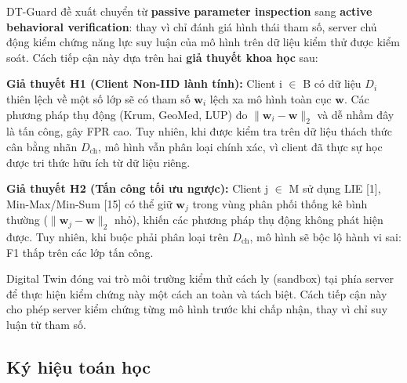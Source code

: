 DT-Guard đề xuất chuyển từ \textbf{passive parameter inspection} sang \textbf{active behavioral verification}: thay vì chỉ đánh giá hình thái tham số, server chủ động kiểm chứng năng lực suy luận của mô hình trên dữ liệu kiểm thử được kiểm soát. Cách tiếp cận này dựa trên hai \textbf{giả thuyết khoa học} sau:

\textbf{Giả thuyết H1 (Client Non-IID lành tính):} Client i $\in$ B có dữ liệu $D_{i}$ thiên lệch về một số lớp sẽ có tham số $\mathbf{w}_{i}$ lệch xa mô hình toàn cục $\mathbf{w}$. Các phương pháp thụ động (Krum, GeoMed, LUP) đo $\|\mathbf{w}_{i} - \mathbf{w}\|_{2}$ và dễ nhầm đây là tấn công, gây FPR cao. Tuy nhiên, khi được kiểm tra trên dữ liệu thách thức cân bằng nhãn $D_{\text{ch}}$, mô hình vẫn phân loại chính xác, vì client đã thực sự học được tri thức hữu ích từ dữ liệu riêng.

\textbf{Giả thuyết H2 (Tấn công tối ưu ngược):} Client j $\in$ M sử dụng LIE {[}1{]}, Min-Max/Min-Sum {[}15{]} có thể giữ $\mathbf{w}_{j}$ trong vùng phân phối thống kê bình thường ($\|\mathbf{w}_{j} - \mathbf{w}\|_{2}$ nhỏ), khiến các phương pháp thụ động không phát hiện được. Tuy nhiên, khi buộc phải phân loại trên $D_{\text{ch}}$, mô hình sẽ bộc lộ hành vi sai: F1 thấp trên các lớp tấn công.

Digital Twin đóng vai trò môi trường kiểm thử cách ly (sandbox) tại phía server để thực hiện kiểm chứng này một cách an toàn và tách biệt. Cách tiếp cận này cho phép server kiểm chứng từng mô hình trước khi chấp nhận, thay vì chỉ suy luận từ tham số.

\subsection{Ký hiệu toán học}

